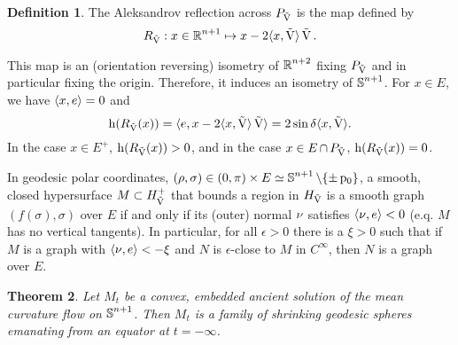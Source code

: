 \documentclass{amsart}
\newtheorem{theorem}{Theorem}
\theoremstyle{definition}
\newtheorem{definition}[theorem]{Definition}
\theoremstyle{remark}
\numberwithin{equation}{section}
\begin{document}
\begin{definition}
The Aleksandrov reflection across \(P_{\operatorname{\vec{V}}}\) is the map defined by
\[
R_{\operatorname{\vec{V}}}: x \in \operatorname{\mathbb{R}}^{n+1} \mapsto x - 2\langle{x},{\operatorname{\vec{V}}}\rangle \operatorname{\vec{V}}.
\]
\end{definition}

This map is an (orientation reversing) isometry of \(\operatorname{\mathbb{R}}^{n+2}\) fixing \(P_{\operatorname{\vec{V}}}\) and in particular fixing the origin. Therefore, it induces an isometry of \(\operatorname{\mathbb{S}}^{n+1}\). For \(x \in E\), we have \(\langle{x},{e}\rangle = 0\) and
\[
\operatorname{h}(R_{\operatorname{\vec{V}}}(x)) = \langle{e},{x - 2 \langle{x},{\operatorname{\vec{V}}}\rangle \operatorname{\vec{V}}}\rangle = 2 \sin\delta \langle{x},{\operatorname{\vec{V}}}\rangle.
\]
In the case \(x \in E^+\), \(\operatorname{h}(R_{\operatorname{\vec{V}}}(x)) > 0\), and in the case \(x \in E \operatorname{\cap} P_{\operatorname{\vec{V}}}\), \(\operatorname{h}(R_{\operatorname{\vec{V}}}(x)) = 0\).

In geodesic polar coordinates, \((\operatorname{\rho}, \sigma) \in (0, \pi) \times E \simeq \operatorname{\mathbb{S}}^{n+1}\backslash \{\pm \operatorname{p_0}\}\), a smooth, closed hypersurface \(M \subset {H}_{{\operatorname{\vec{V}}}}^+\) that bounds a region in \({H}_{{\operatorname{\vec{V}}}}\) is a smooth graph \((f(\sigma), \sigma)\) over \(E\) if and only if its (outer) normal \(\operatorname{\nu}\) satisfies \(\langle{\operatorname{\nu}},{e}\rangle < 0\) (e.q. \(M\) has no vertical tangents). In particular, for all \(\epsilon>0\) there is a \(\xi>0\) such that if \(M\) is a graph with \(\langle{\operatorname{\nu}},{e}\rangle < -\xi\) and \(N\) is \(\epsilon\)-close to \(M\) in \(C^{\infty}\), then \(N\) is a graph over \(E\).

\begin{theorem}
Let \(M_t\) be a convex, embedded ancient solution of the mean curvature flow on \(\operatorname{\mathbb{S}}^{n+1}\). Then \(M_t\) is a family of shrinking geodesic spheres emanating from an equator at \(t=-\infty\).
\end{theorem}
\end{document}
